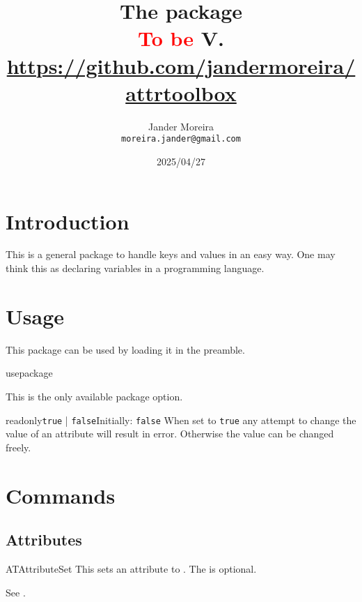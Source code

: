 \documentclass[a4paper, 11pt]{article}
\title{
    The \PackageName{attrtoolbox} package\\
    \small \textcolor{red}{To be} V.\ATVersion\\
    \normalsize\url{https://github.com/jandermoreira/attrtoolbox}
}
\author{Jander Moreira\\\small\texttt{moreira.jander@gmail.com}}
\date{2025/04/27}
\begin{document}
\maketitle
\tableofcontents
\PDPrintChanges



\section{Introduction}
This is a general package to handle keys and values in an easy way. One may think this as declaring variables in a programming language.


\section{Usage}
This package can be used by loading it in the preamble.

\begin{Macro*}{usepackage}{}{}
\end{Macro*}

This is the only available package option.

\begin{Optiondef}{readonly}{\texttt{true} | \texttt{false}}{Initially: \texttt{false}}
    When set to \texttt{true} any attempt to change the value of an attribute will result in error. Otherwise the value can be changed freely.
\end{Optiondef}

\begin{PDListing}
    \usepackage[readonly]{attrtoolbox}
\end{PDListing}


\section{Commands}

\subsection{Attributes}

\begin{Macrodef}{ATAttributeSet}{}{}
    This sets an attribute  to . The  is optional.

    See .
\end{Macrodef}
\end{document}
